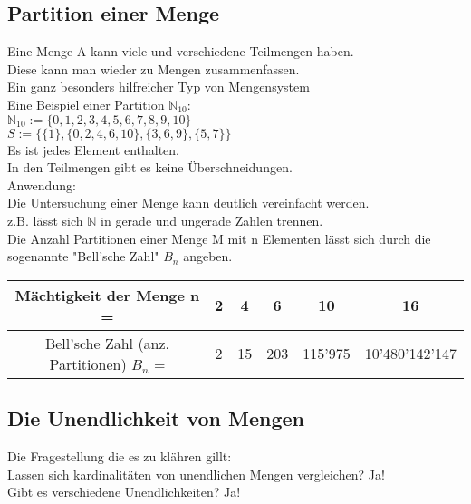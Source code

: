 \documentclass[../gruppenarbeit_1.tex]{subfiles}
\begin{document}
\subsection{Partition einer Menge}

Eine Menge A kann viele und verschiedene Teilmengen haben.\\
Diese kann man wieder zu Mengen zusammenfassen.\\
Ein ganz besonders hilfreicher Typ von Mengensystem\\

Eine Beispiel einer Partition $\mathbb{N}_{10}$:\\
$\mathbb{N}_{10} := \{0,1,2,3,4,5,6,7,8,9,10\}$\\
$S := \{\{1\},\{0,2,4,6,10\},\{3,6,9\},\{5,7\}\}$\\
Es ist jedes Element enthalten.\\
In den Teilmengen gibt es keine Überschneidungen.\\

Anwendung:\\
Die Untersuchung einer Menge kann deutlich vereinfacht werden.\\
z.B. lässt sich $\mathbb{N}$ in gerade und ungerade Zahlen trennen.\\

Die Anzahl Partitionen einer Menge M mit n Elementen lässt sich durch die sogenannte "Bell'sche Zahl" $B_n$ angeben.\\

\begin{table}[ht]
    \begin{tabular}{c|c|c|c|c|c}
      Mächtigkeit der Menge n = & 2 & 4 & 6 & 10 & 16 \\ \hline
      Bell'sche Zahl (anz. Partitionen) $B_n$ = & 2 & 15 & 203 & 115'975 & 10'480'142'147 \\
    \end{tabular}
    \quad
\end{table}

\subsection{Die Unendlichkeit von Mengen}

Die Fragestellung die es zu klähren gillt:\\
Lassen sich kardinalitäten von unendlichen Mengen vergleichen? Ja!\\
Gibt es verschiedene Unendlichkeiten? Ja!\\
\end{document}
